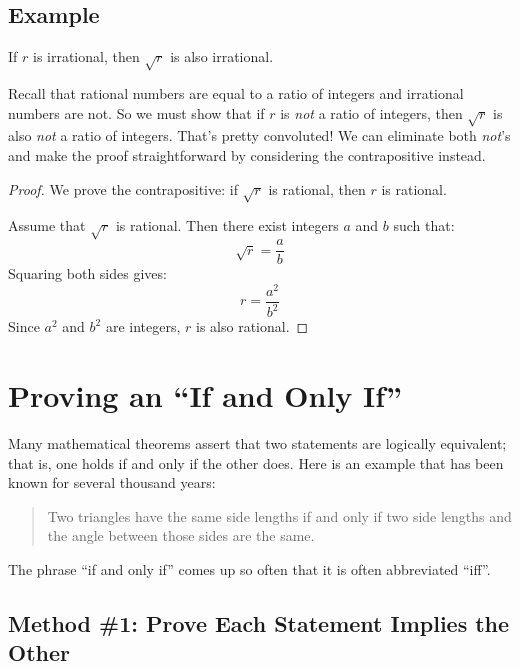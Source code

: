 \subsection*{Example}

\begin{theorem}
If $r$ is irrational, then $\sqrt{r}$ is also irrational.
\end{theorem}

Recall that rational numbers are equal to a ratio of integers and
irrational numbers are not.  So we must show that if $r$ is \textit{not} a
ratio of integers, then $\sqrt{r}$ is also \textit{not} a ratio of
integers.  That's pretty convoluted!  We can eliminate both \emph{not}'s
and make the proof straightforward by considering the contrapositive
instead.

\begin{proof}
We prove the contrapositive: if $\sqrt{r}$ is rational, then $r$ is
rational.

Assume that $\sqrt{r}$ is rational.  Then there exist integers $a$ and $b$
such that:
%
\[
\sqrt{r} = \frac{a}{b}
\]
%
Squaring both sides gives:
%
\[
r  = \frac{a^2}{b^2}
\]
%
Since $a^2$ and $b^2$ are integers, $r$ is also rational.
\end{proof}

\begin{problems}
\homeworkproblems
{}
\end{problems}

\section{Proving an ``If and Only If''}
\label{sec:prove_iff}

Many mathematical theorems assert that two statements are logically
equivalent; that is, one holds if and only if the other does.  Here is an
example that has been known for several thousand years:
\begin{quote}
Two triangles have the same side lengths if and only if two
side lengths and the angle between those sides are the same.
\end{quote}

The phrase ``if and only if'' comes up so often that it is often
abbreviated ``iff''.

\subsection{Method \#1:  Prove Each Statement Implies the Other}

